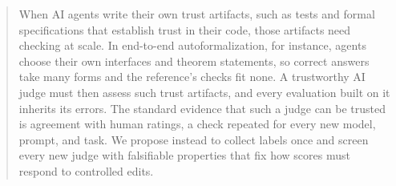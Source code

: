 \begin{abstract}
When AI agents write their own trust artifacts, such as tests and formal specifications that establish trust in their code, those artifacts need checking at scale.
In end-to-end autoformalization, for instance, agents choose their own interfaces and theorem statements, so correct answers take many forms and the reference's checks fit none.
A trustworthy AI judge must then assess such trust artifacts, and every evaluation built on it inherits its errors.
The standard evidence that such a judge can be trusted is agreement with human ratings, a check repeated for every new model, prompt, and task.
We propose instead to collect labels once and screen every new judge with falsifiable properties that fix how scores must respond to controlled edits.

\end{abstract}
